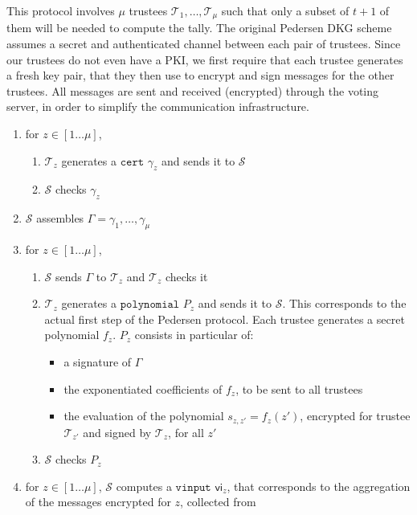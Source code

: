 \documentclass[a4paper]{article}
\newcommand{\cert}{\texttt{cert}}
\newcommand{\poly}{\texttt{polynomial}}
\newcommand{\vinput}{\texttt{vinput}}
\begin{document}
This protocol involves $\mu$ trustees
$\mathcal{T}_1,\dots,\mathcal{T}_\mu$ such that only a subset of
$t+1$ of them will be needed to compute the tally.
The original Pedersen DKG scheme~\cite{Pedersen} assumes a secret and authenticated
channel between each pair of trustees. Since our trustees do not even
have a PKI, we first require that each trustee generates a fresh key
pair, that they then use to encrypt and sign messages for the other
trustees. All messages are sent and received (encrypted) through the voting server,
in order to simplify the communication infrastructure.
\begin{enumerate}
\item for $z\in[1\dots \mu]$,
  \begin{enumerate}
  \item $\mathcal{T}_z$ generates a \hyperref[certificates]{$\cert$} $\gamma_z$
    and sends it to $\mathcal{S}$
  \item $\mathcal{S}$ checks $\gamma_z$
  \end{enumerate}
\item $\mathcal{S}$ assembles $\Gamma=\gamma_1,\dotsc,\gamma_\mu$
\item for $z\in[1\dots \mu]$,
  \begin{enumerate}
  \item $\mathcal{S}$ sends $\Gamma$ to $\mathcal{T}_z$ and $\mathcal{T}_z$ checks it
  \item $\mathcal{T}_z$ generates a \hyperref[polynomials]{$\poly$} $P_z$ and
    sends it to $\mathcal{S}$. This corresponds to the actual first
    step of the Pedersen protocol. Each trustee generates a secret
    polynomial $f_z$. $P_z$ consists in particular of:
    \begin{itemize}
    \item a signature of $\Gamma$
    \item the exponentiated coefficients of $f_z$, to be sent to all
      trustees
    \item the evaluation of the polynomial $s_{z,z'}=f_z(z')$, encrypted for
      trustee $\mathcal{T}_{z'}$ and signed by $\mathcal{T}_z$, for all $z'$
    \end{itemize}
  \item $\mathcal{S}$ checks $P_z$
  \end{enumerate}
\item for $z\in[1\dots \mu]$, $\mathcal{S}$ computes a
  \hyperref[vinputs]{$\vinput$} $\textsf{vi}_z$, that corresponds to
  the aggregation of the messages encrypted for $z$, collected from

\end{enumerate}
\end{document}
